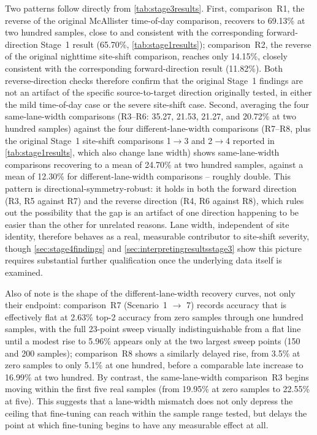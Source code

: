 \documentclass{iutbscthesis}
\begin{document}
Two patterns follow directly from \autoref{tab:stage3results}. First, comparison~R1, the reverse of the original McAllister time-of-day comparison, recovers to 69.13\% at two hundred samples, close to and consistent with the corresponding forward-direction Stage~1 result (65.70\%, \autoref{tab:stage1results}); comparison~R2, the reverse of the original nighttime site-shift comparison, reaches only 14.15\%, closely consistent with the corresponding forward-direction result (11.82\%). Both reverse-direction checks therefore confirm that the original Stage~1 findings are not an artifact of the specific source-to-target direction originally tested, in either the mild time-of-day case or the severe site-shift case. Second, averaging the four same-lane-width comparisons (R3--R6: 35.27, 21.53, 21.27, and 20.72\% at two hundred samples) against the four different-lane-width comparisons (R7--R8, plus the original Stage~1 site-shift comparisons 1$\to$3 and 2$\to$4 reported in \autoref{tab:stage1results}, which also change lane width) shows same-lane-width comparisons recovering to a mean of 24.70\% at two hundred samples, against a mean of 12.30\% for different-lane-width comparisons -- roughly double. This pattern is directional-symmetry-robust: it holds in both the forward direction (R3, R5 against R7) and the reverse direction (R4, R6 against R8), which rules out the possibility that the gap is an artifact of one direction happening to be easier than the other for unrelated reasons. Lane width, independent of site identity, therefore behaves as a real, measurable contributor to site-shift severity, though \autoref{sec:stage4findings} and \autoref{sec:interpretingresultsstage3} show this picture requires substantial further qualification once the underlying data itself is examined.

Also of note is the shape of the different-lane-width recovery curves, not only their endpoint: comparison~R7 (Scenario~1 $\to$ 7) records accuracy that is effectively flat at 2.63\% top-2 accuracy from zero samples through one hundred samples, with the full 23-point sweep visually indistinguishable from a flat line until a modest rise to 5.96\% appears only at the two largest sweep points (150 and 200 samples); comparison~R8 shows a similarly delayed rise, from 3.5\% at zero samples to only 5.1\% at one hundred, before a comparable late increase to 16.99\% at two hundred. By contrast, the same-lane-width comparison~R3 begins moving within the first five real samples (from 19.95\% at zero samples to 22.55\% at five). This suggests that a lane-width mismatch does not only depress the ceiling that fine-tuning can reach within the sample range tested, but delays the point at which fine-tuning begins to have any measurable effect at all.
\end{document}
